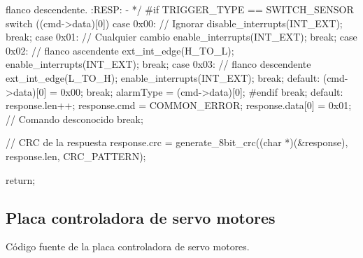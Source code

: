 {\begin{verbatimtab}
{{			flanco descendente.
			:RESP:
			-
			*/
#if TRIGGER_TYPE == SWITCH_SENSOR
			switch ((cmd->data)[0])
			{
				case 0x00:
					// Ignorar
					disable_interrupts(INT_EXT);
					break;
				case 0x01:
					// Cualquier cambio
					enable_interrupts(INT_EXT);
					break;
				case 0x02:
					// flanco ascendente
					ext_int_edge(H_TO_L);
					enable_interrupts(INT_EXT);
					break;
				case 0x03:
					// flanco descendente
					ext_int_edge(L_TO_H);
					enable_interrupts(INT_EXT);
					break;
				default:
					(cmd->data)[0] = 0x00;
					break;
			}
			alarmType = (cmd->data)[0];
#endif
		break;
		default:
			response.len++;
			response.cmd = COMMON_ERROR;
			response.data[0] = 0x01; // Comando desconocido
		break;
	}	

	// CRC de la respuesta
	response.crc = generate_8bit_crc((char *)(&response), response.len, CRC_PATTERN);

	return;
}
\end{verbatimtab}
}


\subsection{Placa controladora de servo motores}
\label{hA_source_servo}

C\'odigo fuente de la placa controladora de servo motores.

